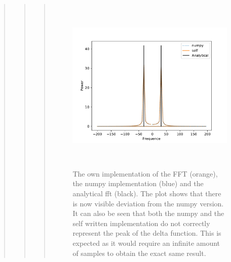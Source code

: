 \begin{quote}
\begin{quote}
\begin{quote}
\begin{figure}[!ht]
\centering
\includegraphics[width=14cm, height=8.5cm]{./Plots/5d_fourier.pdf}
\caption{The own implementation of the FFT (orange), the numpy implementation (blue) and the analytical fft (black). The plot shows that there is now visible deviation from the numpy version. It can also be seen that both the numpy and the self written implementation do not correctly represent the peak of the delta function. This is expected as it would require an infinite amount of samples to obtain the exact same result. }
\end{figure}
\end{quote}


\end{quote}
\end{quote}











